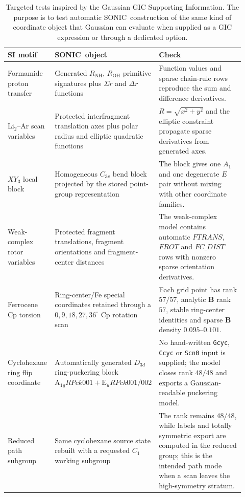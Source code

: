 \documentclass[journal=jctcce,manuscript=article,layout=traditional]{achemso}
\newcommand{\SONIC}{SONIC}
\newcommand{\Bmat}{\mathbf{B}}
\theoremstyle{definition}
\begin{document}
\begin{table}[htbp]
\centering
\scriptsize
\setlength{\tabcolsep}{3pt}
\caption{Targeted tests inspired by the Gaussian GIC Supporting Information.
The purpose is to test automatic \SONIC\ construction of the same kind of
coordinate object that Gaussian can evaluate when supplied as a GIC expression
or through a dedicated option.}
\label{tab:frisch-si}
\begin{tabular}{@{}p{0.20\linewidth}p{0.31\linewidth}p{0.41\linewidth}@{}}
\toprule
SI motif & \SONIC\ object & Check \\
\midrule
Formamide proton transfer & Generated \(R_{\mathrm{NH}}\), \(R_{\mathrm{OH}}\)
primitive signatures plus \(\Sigma r\) and \(\Delta r\) functions & Function
values and sparse chain-rule rows reproduce the sum and difference derivatives. \\
Li\(_2\)--Ar scan variables & Protected interfragment translation axes plus
polar radius and elliptic quadratic functions & \(R=\sqrt{x^2+y^2}\) and the
elliptic constraint propagate sparse derivatives from generated axes. \\
\(XY_3\) local block & Homogeneous \(C_{3v}\) bend block projected by the stored
point-group representation & The block gives one \(A_1\) and one degenerate
\(E\) pair without mixing with other coordinate families. \\
Weak-complex rotor variables & Protected fragment translations, fragment
orientations and fragment-center distances & The weak-complex model contains
automatic \(FTRANS\), \(FROT\) and \(FC\_DIST\) rows with nonzero sparse
orientation derivatives. \\
Ferrocene Cp torsion & Ring-center/Fe special coordinates retained through a
\(0,9,18,27,36^\circ\) Cp rotation scan & Each grid point has rank
\(57/57\), analytic \(\Bmat\) rank \(57\), stable ring-center identities and
sparse \(\Bmat\) density \(0.095\)--\(0.101\). \\
Cyclohexane ring flip coordinate & Automatically generated \(D_{3d}\)
ring-puckering block \(\mathrm{A}_{1g}RPck001+\mathrm{E}_uRPck001/002\) &
No hand-written \texttt{Gcyc}, \texttt{Ccyc} or \texttt{Scn0} input is supplied;
the model closes rank \(48/48\) and exports a Gaussian-readable puckering
model. \\
Reduced path subgroup & Same cyclohexane source state rebuilt with a requested
\(C_1\) working subgroup & The rank remains \(48/48\), while labels and
totally symmetric export are computed in the reduced group; this is the
intended path mode when a scan leaves the high-symmetry stratum. \\
\bottomrule
\end{tabular}
\end{table}
\end{document}
